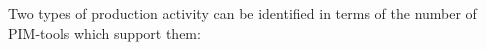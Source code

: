 Two types of production activity can be identified in terms of the number of PIM-tools which support them:

